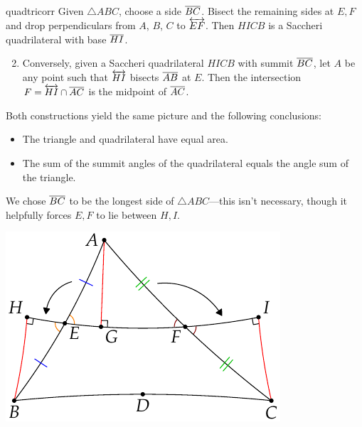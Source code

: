\begin{lemm}{}{quadtricorr}
	\exstart Given $\triangle ABC$, choose a side $\overline{BC}$. Bisect the remaining sides at $E,F$ and drop perpendiculars from $A$, $B$, $C$ to $\overleftrightarrow{EF}$. Then $HICB$ is a Saccheri quadrilateral with base $\overline{HI}$.\vspace{-5pt}
	\begin{enumerate}\setcounter{enumi}{1}
	  \item Conversely, given a Saccheri quadrilateral $HICB$ with summit $\overline{BC}$, let $A$ be any point such that $\overleftrightarrow{HI}$ bisects $\overline{AB}$ at $E$. Then the intersection $F=\overleftrightarrow{HI}\cap\overline{AC}$ is the midpoint of $\overline{AC}$.
	\end{enumerate}
	\begin{minipage}[t]{0.6\linewidth}\vspace{-5pt}
	Both constructions yield the same picture and the following conclusions:\vspace{-5pt}
	  \begin{itemize}\itemsep0pt
	    \item The triangle and quadrilateral have equal area.
	    \item The sum of the summit angles of the quadrilateral equals the angle sum of the triangle.
	  \end{itemize}
	  We chose $\overline{BC}$ to be the longest side of $\triangle ABC$---this isn't necessary, though it helpfully forces $E,F$ to lie between $H,I$.
	\end{minipage}
	\hfill
	\begin{minipage}[t]{0.39\linewidth}\vspace{-15pt}
		\flushright\includegraphics[scale=0.95]{area-saccheri4}
	\end{minipage}
\end{lemm}


